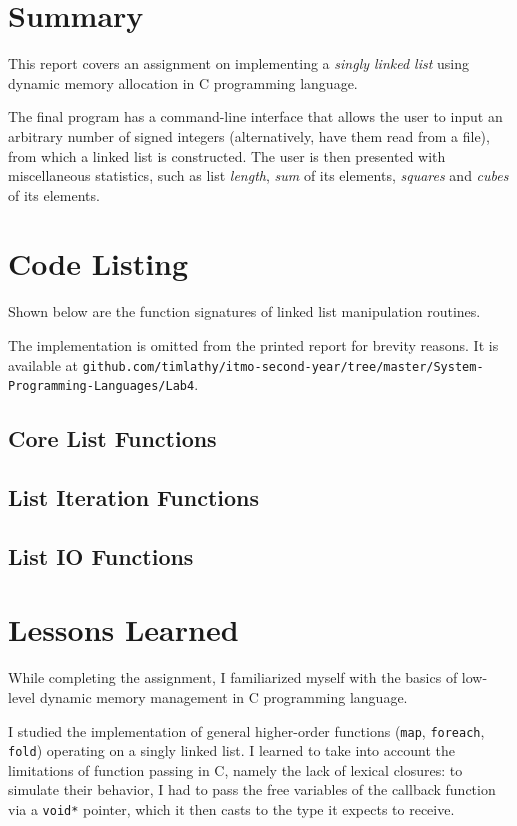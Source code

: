 \documentclass[en, listings]{labreport}
\begin{document}
\maketitlepage

\section*{Summary}

This report covers an assignment on implementing a \textit{singly linked list}
using dynamic memory allocation in C programming language.

The final program has a command-line interface that allows the user to input
an arbitrary number of signed integers (alternatively, have them read from
a file), from which a linked list is constructed. The user is then presented
with miscellaneous statistics, such as list \textit{length}, \textit{sum} of its
elements, \textit{squares} and \textit{cubes} of its elements.

\section*{Code Listing}

Shown below are the function signatures of linked list manipulation routines.

The implementation is omitted from the printed report for brevity reasons.
It is available at \texttt{\small github.com/timlathy/itmo-second-year/tree/master/System-Programming-Languages/Lab4}.

\subsection*{Core List Functions}



\subsection*{List Iteration Functions}



\subsection*{List IO Functions}



\section*{Lessons Learned}

While completing the assignment, I familiarized myself with the 
basics of low-level dynamic memory management in C programming language.

I studied the implementation of general higher-order functions (\texttt{map},
\texttt{foreach}, \texttt{fold}) operating on a singly linked list.
I learned to take into account the limitations of function passing in C,
namely the lack of lexical closures: to simulate their behavior,
I had to pass the free variables of the callback function via a
\texttt{void*} pointer, which it then casts to the type it expects to receive.
\end{document}
